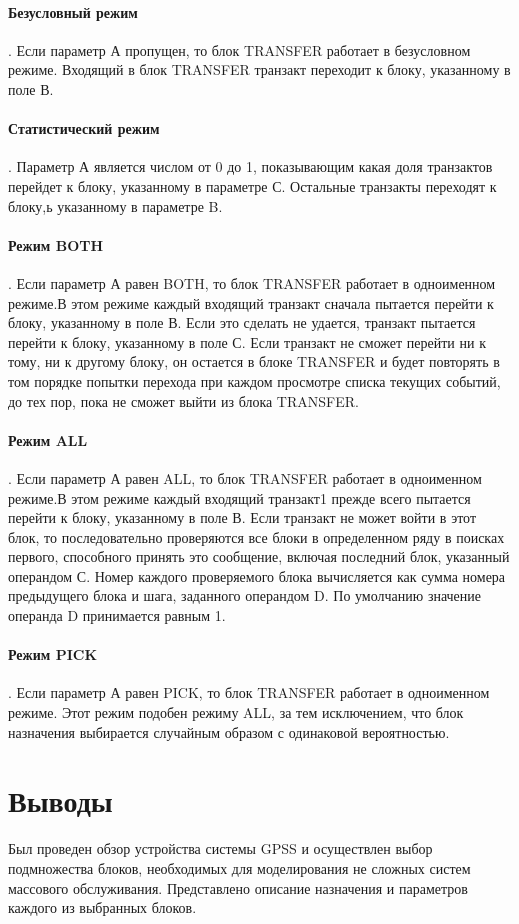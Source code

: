 \paragraph{Безусловный режим}. Если параметр А пропущен, то блок TRANSFER работает в безусловном режиме. Входящий в блок TRANSFER транзакт переходит к блоку, указанному в поле В.

\paragraph{Статистический режим}. Параметр А является числом от 0 до 1, показывающим какая доля транзактов перейдет к блоку, указанному в параметре С. Остальные транзакты переходят к блоку,ь указанному в параметре B.

\paragraph{Режим BOTH}. Если параметр А равен BOTH, то блок TRANSFER работает в одноименном режиме.В этом режиме каждый входящий транзакт сначала пытается перейти к блоку, указанному в поле В. Если это сделать не удается, транзакт пытается перейти к блоку, указанному в поле С. Если транзакт не сможет перейти ни к тому, ни к другому блоку, он остается в блоке TRANSFER и будет повторять в том порядке попытки перехода при каждом просмотре списка текущих событий, до тех пор, пока не сможет выйти из блока TRANSFER.

\paragraph{Режим ALL}. Если параметр А равен ALL, то блок TRANSFER работает в одноименном режиме.В этом режиме каждый входящий транзакт1 прежде всего пытается перейти к блоку, указанному в поле В. Если транзакт не может войти в этот блок, то последовательно проверяются все блоки в определенном ряду в поисках первого, способного принять это сообщение, включая последний блок, указанный операндом С. Номер каждого проверяемого блока вычисляется как сумма номера предыдущего блока и шага, заданного операндом D. По умолчанию значение операнда D принимается равным 1.

\paragraph{Режим PICK}. Если параметр А равен PICK, то блок TRANSFER работает в одноименном режиме. Этот режим подобен режиму ALL, за тем исключением, что блок назначения выбирается случайным образом с одинаковой вероятностью.

\section{Выводы}

Был проведен обзор устройства системы GPSS и осуществлен выбор подмножества блоков, необходимых для моделирования не сложных систем массового обслуживания. Представлено описание назначения и параметров каждого из выбранных блоков.
